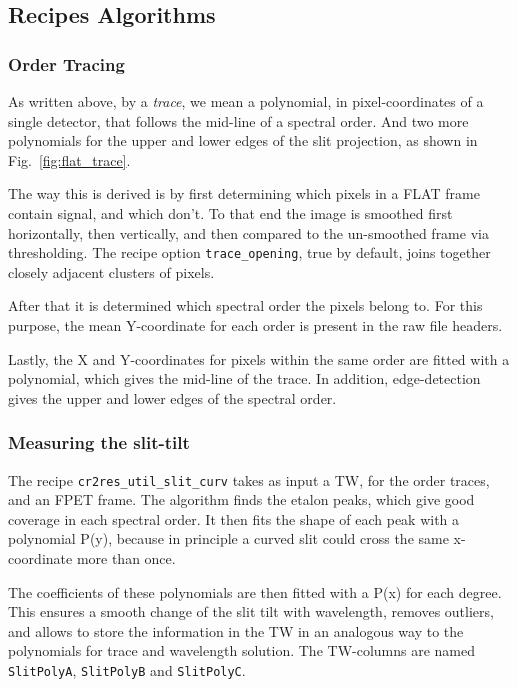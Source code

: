\subsection{Recipes Algorithms} 
\label{sec:algorithms-recipes}


\subsubsection{Order Tracing}
\label{sec:ordertrace}

As written above, by a \emph{trace}, we mean a polynomial, in pixel-coordinates
of a single detector, that follows the mid-line of a spectral order. And two
more polynomials for the upper and lower edges of the slit projection, as shown
in Fig.~\ref{fig:flat_trace}.

The way this is derived is by first determining which pixels in a FLAT frame
contain signal, and which don't. To that end the image is smoothed first
horizontally, then vertically, and then compared to the un-smoothed frame via
thresholding. The recipe option \verb!trace_opening!, true by default, joins
together closely adjacent clusters of pixels.

After that it is determined which spectral order the pixels belong to. For this
purpose, the mean Y-coordinate for each order is present in the raw file
headers.

Lastly, the X and Y-coordinates for pixels within the same order are fitted with
a polynomial, which gives the mid-line of the trace. In addition, edge-detection
gives the upper and lower edges of the spectral order.

\subsubsection{Measuring the slit-tilt}
\label{sec:tilt}

The recipe \verb!cr2res_util_slit_curv! takes as input a TW, for the order
traces, and an FPET frame. The algorithm finds the etalon peaks, which give good
coverage in each spectral order. It then fits the shape of each peak with a
polynomial P(y), because in principle a curved slit could cross the same
x-coordinate more than once.

The coefficients of these polynomials are then fitted with a P(x) for each
degree. This ensures a smooth change of the slit tilt with wavelength, removes
outliers, and allows to store the information in the TW in an analogous way to
the polynomials for trace and wavelength solution. The TW-columns are named
\verb!SlitPolyA!, \verb!SlitPolyB! and \verb!SlitPolyC!.


